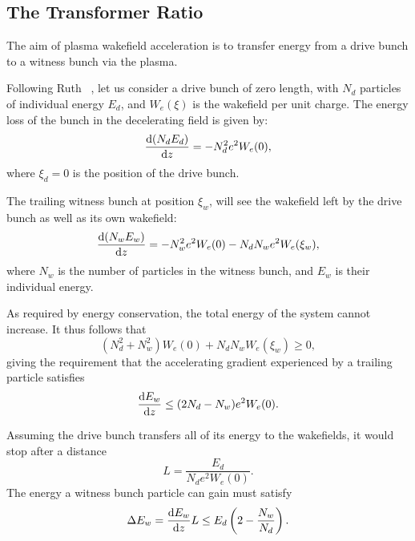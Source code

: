 \subsection{The Transformer Ratio}
\label{Int:BPI:TRat}

The aim of plasma wakefield acceleration is to transfer energy from a drive bunch to a witness bunch via the plasma.

Following Ruth \etal~\cite{ruth:1985}, let us consider a drive bunch of zero length, with $N_{d}$ particles of individual energy $E_{d}$, and $W_{e}(\xi)$ is the wakefield per unit charge.
The energy loss of the bunch in the decelerating field is given by:
\begin{equation}
    \frac{\mathrm{d} (N_{d}E_{d})}{\mathrm{d} z} = - N_{d}^{2}e^{2}W_{e}(0), \label{EQ:TRat:Drive}
\end{equation}
where $\xi_{d} = 0$ is the position of the drive bunch.

The trailing witness bunch at position $\xi_{w}$, will see the wakefield left by the drive bunch as well as its own wakefield:
\begin{equation}
    \frac{\mathrm{d} (N_{w}E_{w})}{\mathrm{d} z}
        = - N_{w}^{2}e^{2}W_{e}(0) - N_{d}N_{w}e^{2}W_{e}(\xi_{w}), \label{EQ:TRat:Witness}
\end{equation}
where $N_{w}$ is the number of particles in the witness bunch, and $E_{w}$ is their individual energy.

As required by energy conservation, the total energy of the system cannot increase.
It thus follows that
\begin{equation}
    (N_{d}^{2} + N_{w}^{2})W_{e}(0) + N_{d}N_{w}W_{e}(\xi_{w}) \geq 0, \label{EQ:TRat:EConv}
\end{equation}
giving the requirement that the accelerating gradient experienced by a trailing particle satisfies
\begin{equation}
    \frac{\mathrm{d} E_{w}}{\mathrm{d} z} \leq (2N_{d} - N_{w})e^{2}W_{e}(0). \label{EQ:TRat:Grad}
\end{equation}

Assuming the drive bunch transfers all of its energy to the wakefields, it would stop after a distance
\begin{equation}
    L = \frac{E_{d}}{N_{d}e^{2}W_{e}(0)}. \label{EQ:Trat:LStop}
\end{equation}
The energy a witness bunch particle can gain must satisfy
\begin{equation}
    \Delta E_{w} = \frac{\mathrm{d} E_{w}}{\mathrm{d} z}L
                 \leq E_{d}\left(2-\frac{N_{w}}{N_{d}}\right). \label{EQ:TRat:DeltaE}
\end{equation}


